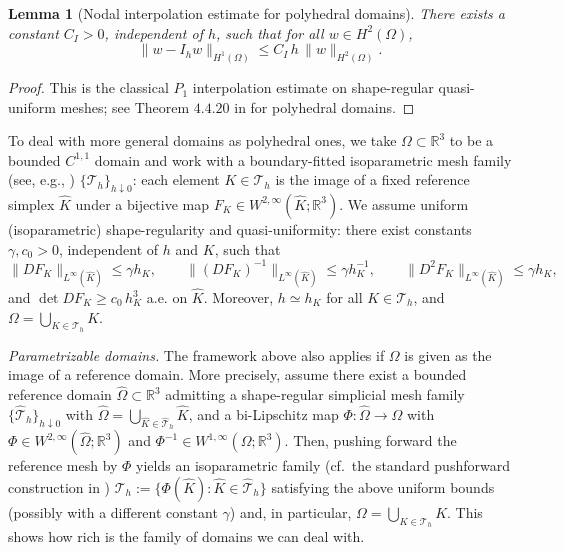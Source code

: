\documentclass[11pt,a4paper]{article}
\numberwithin{equation}{section}
\newtheorem{lemma}[theorem]{Lemma}
\theoremstyle{definition}
\newcommand{\R}{\mathbb{R}}
\newcommand{\1}{\mathbbm{1}}
\begin{document}
\begin{lemma}[Nodal interpolation estimate for polyhedral domains]
\label{lem:app-interp}
There exists a constant $C_I>0$, independent of $h$, such that for all $w\in H^2(\Omega)$,
\begin{equation}
\label{eq:app-interp}
\|w-I_h w\|_{H^1(\Omega)} \le C_I\, h\,\|w\|_{H^2(\Omega)}.
\end{equation}
\end{lemma}

\begin{proof}
This is the classical $P_1$ interpolation estimate on shape-regular quasi-uniform meshes; see Theorem $4.4.20$ in \cite{BrennerScottFEM} for polyhedral domains.
\end{proof}



\medskip
 \noindent To deal with more general domains as polyhedral ones, we take $\Omega\subset\R^3$ to be a bounded $C^{1,1}$ domain and work with a boundary-fitted isoparametric mesh family (see, e.g., \cite{Lenoir1986,CiarletRaviart1972, AzouaniTiti14,LunasinTiti17,EggerFritzKunRod25})
$\{\mathcal T_h\}_{h\downarrow 0}$: each element $K\in\mathcal T_h$ is the image of a fixed reference simplex
$\widehat K$ under a bijective map $F_K\in W^{2,\infty}(\widehat K;\R^3)$.
We assume uniform (isoparametric) shape-regularity and quasi-uniformity: there exist constants $\gamma,c_0>0$,
independent of $h$ and $K$, such that
\begin{equation}\label{eq:app-shapereg}
\|DF_K\|_{L^\infty(\widehat K)}\le \gamma h_K,\qquad
\|(DF_K)^{-1}\|_{L^\infty(\widehat K)}\le \gamma h_K^{-1},\qquad
\|D^2F_K\|_{L^\infty(\widehat K)}\le \gamma h_K,
\end{equation}
and $\det DF_K \ge c_0\, h_K^{3}$ a.e. on $\widehat K$.
Moreover, $h\simeq h_K$ for all $K\in\mathcal T_h$, and $\Omega=\bigcup_{K\in\mathcal T_h}K$.

\medskip
\noindent\emph{Parametrizable domains.}
The framework above also applies if $\Omega$ is given as the image of a reference domain.
More precisely, assume there exist a bounded reference domain $\widehat\Omega\subset\R^3$ admitting a
shape-regular simplicial mesh family $\{\widehat{\mathcal T}_h\}_{h\downarrow 0}$ with
$\widehat\Omega=\bigcup_{\widehat K\in\widehat{\mathcal T}_h}\widehat K$, and a bi-Lipschitz map
$\Phi:\widehat\Omega\to\Omega$ with $\Phi\in W^{2,\infty}(\widehat\Omega;\R^3)$ and $\Phi^{-1}\in W^{1,\infty}(\Omega;\R^3)$.
Then, pushing forward the reference mesh by $\Phi$ yields an isoparametric family (cf.\ the standard pushforward construction in \cite{CiarletRaviart1972,Zlamal1973})
$\mathcal T_h:=\{\Phi(\widehat K):\widehat K\in\widehat{\mathcal T}_h\}$ satisfying the above
uniform bounds (possibly with a different constant $\gamma$) and, in particular, $\Omega=\bigcup_{K\in\mathcal T_h}K$. This shows how rich is the family of domains we can deal with.
\end{document}
